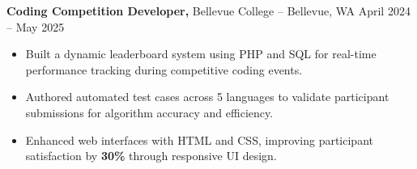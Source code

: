 \documentclass[11pt]{article}
\begin{document}
\textbf{Coding Competition Developer,} {Bellevue College} -- Bellevue, WA \hfill April 2024 -- May 2025
\vspace{-9pt}
\begin{itemize}
  \item Built a dynamic leaderboard system using PHP and SQL for real-time performance tracking during competitive coding events.
  \item Authored automated test cases across 5 languages to validate participant submissions for algorithm accuracy and efficiency.
  \item Enhanced web interfaces with HTML and CSS, improving participant satisfaction by \textbf{30\%} through responsive UI design.
\end{itemize}

\end{document}
